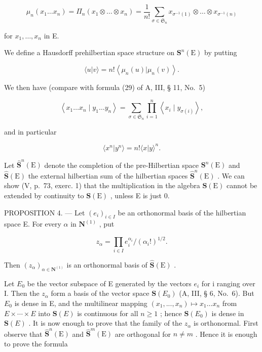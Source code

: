 \[
\mu_ {n} (x _ {1} \dots x _ {n}) = \Pi_ {n} (x _ {1} \otimes \dots \otimes x _ {n}) = \frac {1}{n !} \sum_ {\sigma \in \mathfrak {S} _ {n}} x _ {\sigma^ {- 1} (1)} \otimes \dots \otimes x _ {\sigma^ {- 1} (n)}\tag{13}
\]

for \(x_{1},\ldots ,x_{n}\) in E.

We define a Hausdorff prehilbertian space structure on \(\mathbf{S}^{n}(\mathrm{E})\) by putting

\[
\langle u | v \rangle = n! \left\langle \mu_ {n} (u) | \mu_ {n} (v) \right\rangle .\tag{14}
\]

We then have (compare with formula (29) of A, III, § 11, No.~5)

\[
\left\langle x _ {1} \dots x _ {n} \mid y _ {1} \dots y _ {n} \right\rangle = \sum_ {\sigma \in \mathfrak {S} _ {n}} \prod_ {i = 1} ^ {n} \left\langle x _ {i} \mid y _ {\sigma (i)} \right\rangle ,\tag{15}
\]

and in particular

\[
\langle x ^ {n} | y ^ {n} \rangle = n! \langle x | y \rangle^ {n}.\tag{16}
\]

Let \(\hat{\mathbf{S}}^n (\mathrm{E})\) denote the completion of the pre-Hilbertian space \(\mathbf{S}^n (\mathrm{E})\) and \(\hat{\mathbf{S}} (\mathrm{E})\) the external hilbertian sum of the hilbertian spaces \(\hat{\mathbf{S}}^n (\mathrm{E})\) . We can show (V, p.~73, exerc. 1) that the multiplication in the algebra \(\mathbf{S}(\mathrm{E})\) cannot be extended by continuity to \(\mathbf{S}(\mathrm{E})\) , unless E is just 0.

PROPOSITION 4. --- Let \((e_{i})_{i\in I}\) be an orthonormal basis of the hilbertian space E. For every \(\alpha\) in \(\mathbf{N}^{(1)}\) , put

\[
z _ {\alpha} = \prod_ {i \in I} e _ {i} ^ {\alpha_ {i}} / (\alpha_ {i}!) ^ {1 / 2}.\tag{17}
\]

Then \((z_{\alpha})_{\alpha \in \mathbf{N}^{(1)}}\) is an orthonormal basis of \(\hat{\mathbf{S}} (\mathrm{E})\) .

Let \(E_{0}\) be the vector subspace of E generated by the vectors \(e_{i}\) for i ranging over I. Then the \(z_{\alpha}\) form a basis of the vector space \(\mathbf{S}(E_{0})\) (A, III, § 6, No.~6). But \(E_{0}\) is dense in E, and the multilinear mapping \((x_{1},...,x_{n})\mapsto x_{1}\ldots x_{n}\) from \(E\times\cdots\times E\) into \(\mathbf{S}(E)\) is continuous for all \(n\geqslant1\) ; hence \(\mathbf{S}(E_{0})\) is dense in \(\mathbf{S}(E)\) . It is now enough to prove that the family of the \(z_{\alpha}\) is orthonormal. First observe that \(\hat{\mathbf{S}}^{n}(\mathrm{E})\) and \(\hat{\mathbf{S}}^{m}(\mathrm{E})\) are orthogonal for \(n \neq m\) . Hence it is enough to prove the formula

